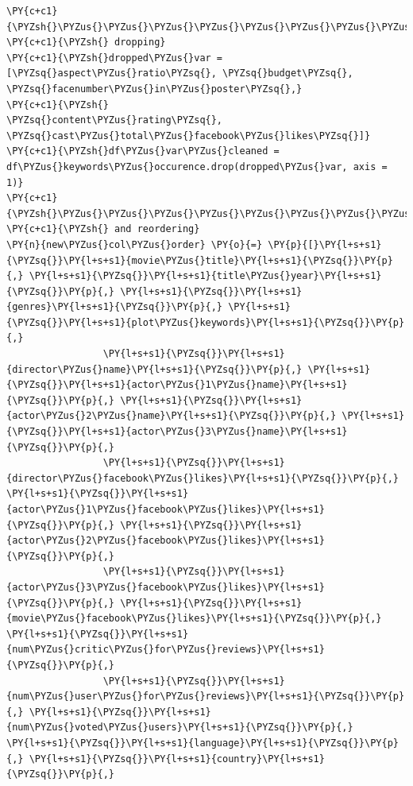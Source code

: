     \begin{tcolorbox}[breakable, size=fbox, boxrule=1pt, pad at break*=1mm,colback=cellbackground, colframe=cellborder]
\begin{Verbatim}[commandchars=\\\{\}]
\PY{c+c1}{\PYZsh{}\PYZus{}\PYZus{}\PYZus{}\PYZus{}\PYZus{}\PYZus{}\PYZus{}\PYZus{}\PYZus{}\PYZus{}}
\PY{c+c1}{\PYZsh{} dropping}
\PY{c+c1}{\PYZsh{}dropped\PYZus{}var = [\PYZsq{}aspect\PYZus{}ratio\PYZsq{}, \PYZsq{}budget\PYZsq{}, \PYZsq{}facenumber\PYZus{}in\PYZus{}poster\PYZsq{},}
\PY{c+c1}{\PYZsh{}               \PYZsq{}content\PYZus{}rating\PYZsq{}, \PYZsq{}cast\PYZus{}total\PYZus{}facebook\PYZus{}likes\PYZsq{}]}
\PY{c+c1}{\PYZsh{}df\PYZus{}var\PYZus{}cleaned = df\PYZus{}keywords\PYZus{}occurence.drop(dropped\PYZus{}var, axis = 1)}
\PY{c+c1}{\PYZsh{}\PYZus{}\PYZus{}\PYZus{}\PYZus{}\PYZus{}\PYZus{}\PYZus{}\PYZus{}\PYZus{}\PYZus{}\PYZus{}\PYZus{}\PYZus{}\PYZus{}\PYZus{}\PYZus{}}
\PY{c+c1}{\PYZsh{} and reordering}
\PY{n}{new\PYZus{}col\PYZus{}order} \PY{o}{=} \PY{p}{[}\PY{l+s+s1}{\PYZsq{}}\PY{l+s+s1}{movie\PYZus{}title}\PY{l+s+s1}{\PYZsq{}}\PY{p}{,} \PY{l+s+s1}{\PYZsq{}}\PY{l+s+s1}{title\PYZus{}year}\PY{l+s+s1}{\PYZsq{}}\PY{p}{,} \PY{l+s+s1}{\PYZsq{}}\PY{l+s+s1}{genres}\PY{l+s+s1}{\PYZsq{}}\PY{p}{,} \PY{l+s+s1}{\PYZsq{}}\PY{l+s+s1}{plot\PYZus{}keywords}\PY{l+s+s1}{\PYZsq{}}\PY{p}{,} 
                 \PY{l+s+s1}{\PYZsq{}}\PY{l+s+s1}{director\PYZus{}name}\PY{l+s+s1}{\PYZsq{}}\PY{p}{,} \PY{l+s+s1}{\PYZsq{}}\PY{l+s+s1}{actor\PYZus{}1\PYZus{}name}\PY{l+s+s1}{\PYZsq{}}\PY{p}{,} \PY{l+s+s1}{\PYZsq{}}\PY{l+s+s1}{actor\PYZus{}2\PYZus{}name}\PY{l+s+s1}{\PYZsq{}}\PY{p}{,} \PY{l+s+s1}{\PYZsq{}}\PY{l+s+s1}{actor\PYZus{}3\PYZus{}name}\PY{l+s+s1}{\PYZsq{}}\PY{p}{,}
                 \PY{l+s+s1}{\PYZsq{}}\PY{l+s+s1}{director\PYZus{}facebook\PYZus{}likes}\PY{l+s+s1}{\PYZsq{}}\PY{p}{,} \PY{l+s+s1}{\PYZsq{}}\PY{l+s+s1}{actor\PYZus{}1\PYZus{}facebook\PYZus{}likes}\PY{l+s+s1}{\PYZsq{}}\PY{p}{,} \PY{l+s+s1}{\PYZsq{}}\PY{l+s+s1}{actor\PYZus{}2\PYZus{}facebook\PYZus{}likes}\PY{l+s+s1}{\PYZsq{}}\PY{p}{,}
                 \PY{l+s+s1}{\PYZsq{}}\PY{l+s+s1}{actor\PYZus{}3\PYZus{}facebook\PYZus{}likes}\PY{l+s+s1}{\PYZsq{}}\PY{p}{,} \PY{l+s+s1}{\PYZsq{}}\PY{l+s+s1}{movie\PYZus{}facebook\PYZus{}likes}\PY{l+s+s1}{\PYZsq{}}\PY{p}{,} \PY{l+s+s1}{\PYZsq{}}\PY{l+s+s1}{num\PYZus{}critic\PYZus{}for\PYZus{}reviews}\PY{l+s+s1}{\PYZsq{}}\PY{p}{,} 
                 \PY{l+s+s1}{\PYZsq{}}\PY{l+s+s1}{num\PYZus{}user\PYZus{}for\PYZus{}reviews}\PY{l+s+s1}{\PYZsq{}}\PY{p}{,} \PY{l+s+s1}{\PYZsq{}}\PY{l+s+s1}{num\PYZus{}voted\PYZus{}users}\PY{l+s+s1}{\PYZsq{}}\PY{p}{,} \PY{l+s+s1}{\PYZsq{}}\PY{l+s+s1}{language}\PY{l+s+s1}{\PYZsq{}}\PY{p}{,} \PY{l+s+s1}{\PYZsq{}}\PY{l+s+s1}{country}\PY{l+s+s1}{\PYZsq{}}\PY{p}{,}

\end{Verbatim}
\end{tcolorbox}
